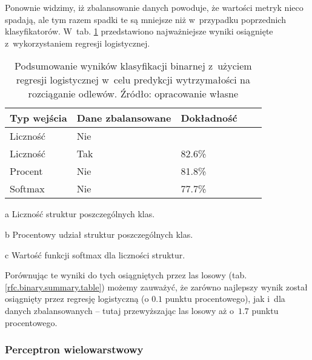 Ponownie widzimy, iż zbalansowanie danych powoduje, że wartości metryk nieco spadają, ale tym razem spadki te są mniejsze niż w~przypadku poprzednich klasyfikatorów. W~tab. \ref{logit.binary.summary.table} przedstawiono najważniejsze wyniki osiągnięte z~wykorzystaniem regresji logistycznej.
\begin{table}[!h]
	\centering
	\begin{threeparttable}
		\caption{Podsumowanie wyników klasyfikacji binarnej z~użyciem regresji logistycznej w~celu predykcji wytrzymałości na rozciąganie odlewów. Źródło: opracowanie własne}
		\label{logit.binary.summary.table}
		\begin{tabularx}{1\textwidth}{ |X|X|X|X|X| }
		  \hline
		  \textbf{Typ wejścia} & \textbf{Dane zbalansowane} & \textbf{Dokładność}\\

		  \hline
		  Liczność\tnote{a} & Nie  & \bo{83.1\%} \\

		  \hline
		  Liczność & Tak & 82.6\%\\

		  \hline
  		  Procent\tnote{b} & Nie & 81.8\%\\

	          \hline
  		  Softmax\tnote{c} & Nie & 77.7\%\\

		  \hline
		\end{tabularx}
		\begin{tablenotes}
			\footnotesize
			\item[a] Liczność struktur poszczególnych klas.
			\item[b] Procentowy udział struktur poszczególnych klas.
			\item[c] Wartość funkcji softmax dla liczności struktur.
		\end{tablenotes}
	\end{threeparttable}
\end{table}
Porównując te wyniki do tych osiągniętych przez las losowy (tab. \ref{rfc.binary.summary.table}) możemy zauważyć, że zarówno najlepszy wynik został osiągnięty przez regresję logistyczną (o $0.1$ punktu procentowego), jak i~dla danych zbalansowanych – tutaj przewyższając las losowy aż o~$1.7$ punktu procentowego. 

\subsubsection{Perceptron wielowarstwowy}
\label{structures.with.mlp}

